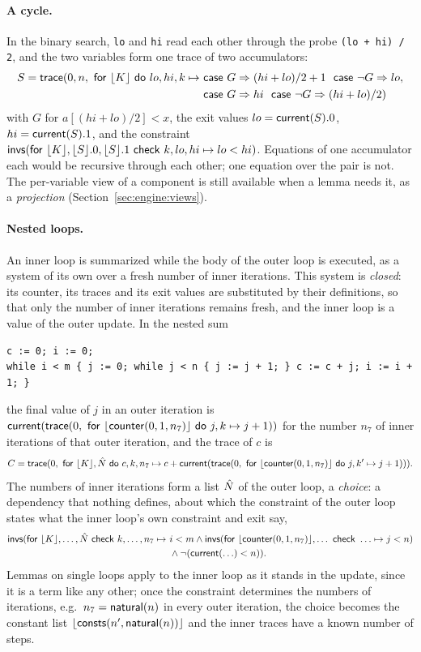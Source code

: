 \paragraph{A cycle.}
In the binary search, \texttt{lo} and \texttt{hi} read each other through the probe \texttt{(lo + hi) / 2},
and the two variables form one trace of two accumulators:
\begin{align*}
  S = \mathsf{trace}(0, n,\ \mathsf{for}\ \lfloor K\rfloor\ \mathsf{do}\ lo, hi, k \mapsto\ &\mathsf{case}\ G \Rightarrow (hi + lo)/2 + 1\ \ \mathsf{case}\ \neg G \Rightarrow lo,\\
  &\mathsf{case}\ G \Rightarrow hi\ \ \mathsf{case}\ \neg G \Rightarrow (hi + lo)/2)
\end{align*}
with $G$ for $a[(hi + lo)/2] < x$, the exit values $lo = \mathsf{current}(S).0$, $hi = \mathsf{current}(S).1$, and the constraint
$\mathsf{invs}(\mathsf{for}\ \lfloor K\rfloor, \lfloor S\rfloor.0, \lfloor S\rfloor.1\ \mathsf{check}\ k, lo, hi \mapsto lo < hi)$. Equations of one accumulator each would be
recursive through each other; one equation over the pair is not. The per-variable view of a component is
still available when a lemma needs it, as a \emph{projection} (Section~\ref{sec:engine:views}).

\paragraph{Nested loops.}
An inner loop is summarized while the body of the outer loop is executed, as a system of its own over a
fresh number of inner iterations. This system is \emph{closed}: its counter, its traces and its exit values
are substituted by their definitions, so that only the number of inner iterations remains fresh, and the
inner loop is a value of the outer update. In the nested sum
\begin{lstlisting}
c := 0; i := 0;
while i < m { j := 0; while j < n { j := j + 1; } c := c + j; i := i + 1; }
\end{lstlisting}
the final value of $j$ in an outer iteration is $\mathsf{current}(\mathsf{trace}(0,\ \mathsf{for}\ \lfloor \mathsf{counter}(0, 1, n_7)\rfloor\ \mathsf{do}\ j, k \mapsto j + 1))$ for
the number $n_7$ of inner iterations of that outer iteration, and the trace of $c$ is
\[ C = \mathsf{trace}(0,\ \mathsf{for}\ \lfloor K\rfloor, \hat{N}\ \mathsf{do}\ c, k, n_7 \mapsto c + \mathsf{current}(\mathsf{trace}(0,\ \mathsf{for}\ \lfloor \mathsf{counter}(0, 1, n_7)\rfloor\ \mathsf{do}\ j, k' \mapsto j + 1))). \]
The numbers of inner iterations form a list $\hat{N}$ of the outer loop, a \emph{choice}: a dependency that
nothing defines, about which the constraint of the outer loop states what the inner loop's own constraint
and exit say,
\begin{align*}
  \mathsf{invs}(\mathsf{for}\ \bl{K}, \ldots, \seq{N}\ \mathsf{check}\ k, \ldots, n_7 \mapsto\
    & i < m \wedge \al{\bl{\cnt(0, 1, n_7)}, \ldots}{\ldots \mapsto j < n}\\
    & {} \wedge \neg(\cur(\ldots) < n)).
\end{align*}
Lemmas on single loops apply to the inner loop as it stands in the update, since it is a term like any
other; once the constraint determines the numbers of iterations, e.g.\ $n_7 = \mathsf{natural}(n)$ in every outer
iteration, the choice becomes the constant list $\lfloor \mathsf{consts}(n', \mathsf{natural}(n))\rfloor$ and the inner traces have
a known number of steps.

